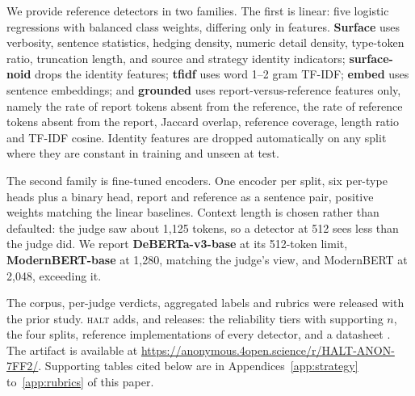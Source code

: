 We provide reference detectors in two families. The first is linear: five
logistic regressions with balanced class weights, differing only in features.
\textbf{Surface} uses verbosity, sentence statistics, hedging density, numeric
detail density, type-token ratio, truncation length, and source and strategy
identity indicators; \textbf{surface-noid} drops the identity features;
\textbf{tfidf} uses word 1--2 gram TF-IDF; \textbf{embed} uses sentence
embeddings; and \textbf{grounded} uses report-versus-reference features only,
namely the rate of report tokens absent from the reference, the rate of
reference tokens absent from the report, Jaccard overlap, reference coverage,
length ratio and TF-IDF cosine. Identity features are dropped automatically on
any split where they are constant in training and unseen at test.

The second family is fine-tuned encoders. One encoder per split, six per-type heads plus a
binary head, report and reference as a sentence pair, positive weights matching
the linear baselines. Context length is chosen rather than defaulted: the judge
saw about 1{,}125 tokens, so a detector at 512 sees less than the judge did. We
report \textbf{DeBERTa-v3-base} at its 512-token limit, \textbf{ModernBERT-base}
at 1{,}280, matching the judge's view, and ModernBERT at 2{,}048, exceeding
it.

The corpus, per-judge verdicts, aggregated labels and rubrics were released
with the prior study. \textsc{halt} adds, and releases: the reliability tiers
with supporting $n$, the four splits, reference implementations of every
detector, and a datasheet \citep{gebru2021datasheets}. The artifact is
available at \url{https://anonymous.4open.science/r/HALT-ANON-7FF2/}.
Supporting tables cited below are in Appendices~\ref{app:strategy}
to~\ref{app:rubrics} of this paper.
